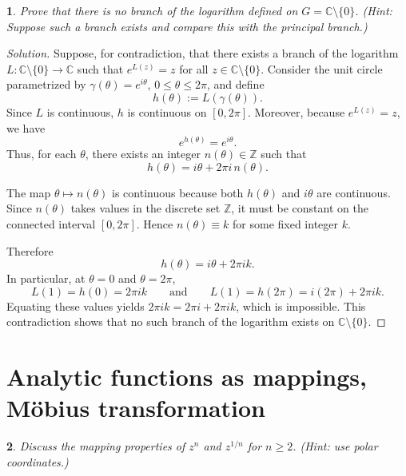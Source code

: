 \documentclass[12pt, a4paper]{report}
\theoremstyle{spaced}
\newtheorem{exercise}{}
\newcommand{\setexercise}[1]{\setcounter{exercise}{#1-1}}
\begin{document}
\setexercise{21}
\begin{exercise}
	Prove that there is no branch of the logarithm defined on \(G=\mathbb{C}\setminus\{0\}\).
	\emph{(Hint: Suppose such a branch exists and compare this with the principal branch.)}
\end{exercise}

\begin{proof}[Solution]
	Suppose, for contradiction, that there exists a branch of the logarithm
	\(L : \mathbb{C}\setminus\{0\}\to \mathbb{C}\) such that \(e^{L(z)}=z\) for all
	\(z\in\mathbb{C}\setminus\{0\}\).
	Consider the unit circle parametrized by \(\gamma(\theta)=e^{i\theta}\),
	\(0 \le \theta \le 2\pi\), and define
	\[
		h(\theta) := L(\gamma(\theta)).
	\]
	Since \(L\) is continuous, \(h\) is continuous on \([0,2\pi]\).
	Moreover, because \(e^{L(z)}=z\), we have
	\[
		e^{h(\theta)} = e^{i\theta}.
	\]
	Thus, for each \(\theta\), there exists an integer \(n(\theta)\in\mathbb{Z}\)
	such that
	\[
		h(\theta) = i\theta + 2\pi i\, n(\theta).
	\]

	The map \(\theta \mapsto n(\theta)\) is continuous because both \(h(\theta)\)
	and \(i\theta\) are continuous. Since \(n(\theta)\) takes values in the
	discrete set \(\mathbb{Z}\), it must be constant on the connected interval
	\([0,2\pi]\). Hence \(n(\theta) \equiv k\) for some fixed integer \(k\).

	Therefore
	\[
		h(\theta) = i\theta + 2\pi i k.
	\]
	In particular, at \(\theta = 0\) and \(\theta = 2\pi\),
	\[
		L(1) = h(0) = 2\pi i k
		\qquad\text{and}\qquad
		L(1) = h(2\pi) = i(2\pi) + 2\pi i k.
	\]
	Equating these values yields \(2\pi i k = 2\pi i + 2\pi i k\), which is
	impossible. This contradiction shows that no such branch of the logarithm
	exists on \(\mathbb{C}\setminus\{0\}\).
\end{proof}

\section{Analytic functions as mappings, Möbius transformation}

\setexercise{4}
\begin{exercise}
	Discuss the mapping properties of \(z^{n}\) and \(z^{1/n}\) for \(n\ge 2\). \emph{(Hint: use polar coordinates.)}
\end{exercise}
\end{document}
